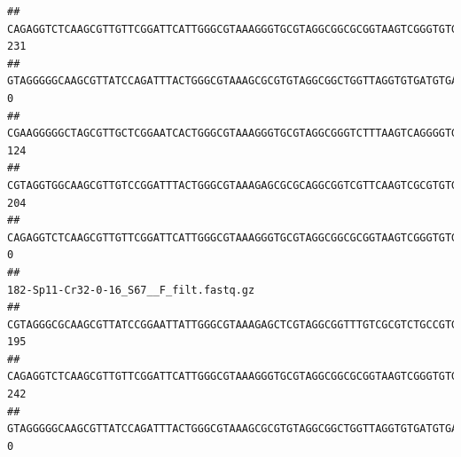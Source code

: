 \documentclass[]{article}
\begin{document}
\begin{verbatim}
## CAGAGGTCTCAAGCGTTGTTCGGATTCATTGGGCGTAAAGGGTGCGTAGGCGGCGCGGTAAGTCGGGTGTGAAATCTCGGAGCTTAACTCCGAAACTGCATTCGATACTGCCGTGCTTGAGGACTGGAGAGGAGACTGGAATTTACGGTGTAGCGGTGAAATGCGTAGATATCGTAAGGAAGACCAGTGGCGAAGGCGGGTCTCTGGACAGTTCCTGACGCTGAGGCACGAAGGCCAGGGGAGCAAACG                                     231
## GTAGGGGGCAAGCGTTATCCAGATTTACTGGGCGTAAAGCGCGTGTAGGCGGCTGGTTAGGTGTGATGTGAAATCTTCCGGCTCAACCGGAAAACTGCATTGCAAACCGGCCTGGCTAGAGTGCAGGAGAGGGAAGCGGAATTCCAGGTGTAGCGGTGAAATGCGTAGATATCTGGAGGAACACCAGTGGCGAAGGCGGCTTCCTGGCCTGCAACTGACGCTGAGACGCGAAAGCGTGGGGAGCGAAC                                        0
## CGAAGGGGGCTAGCGTTGCTCGGAATCACTGGGCGTAAAGGGTGCGTAGGCGGGTCTTTAAGTCAGGGGTGAAATCCTGGAGCTCAACTCCAGAACTGCCTTTGATACTGAAGATCTTGAGTTCGGGAGAGGTGAGTGGAACTGCGAGTGTAGAGGTGAAATTCGTAGATATTCGCAAGAACACCAGTGGCGAAGGCGGCTCACTGGCCCGATACTGACGCTGAGGCACGAAAGCGTGGGGAGCAAACA                                     124
## CGTAGGTGGCAAGCGTTGTCCGGATTTACTGGGCGTAAAGAGCGCGCAGGCGGTCGTTCAAGTCGCGTGTGAAAGCCCCCGGCTCAACTGGGGAGGGTCACGCGATACTGATCGACTCGAAGGCAGGAGAGGGTAGTGGAATTCCCGGTGTAGTGGTGAAATGCGTAGATATCGGGAGGAACACCAGTGGCGAAGGCGACTACCTGGCCTGTTCTTGACGCTGAGGCGCGAAAGCTAGGGGAGCAAACG                                     204
## CAGAGGTCTCAAGCGTTGTTCGGATTCATTGGGCGTAAAGGGTGCGTAGGCGGCGCGGTAAGTCGGGTGTGAAATCTCGGGGCTTAACTCCGAAACTGCATTCGATACTGCCGTGCTTGAGGACTGGAGAGGAGACTGGAATTTACGGTGTAGCGGTGAAATGCGTAGATATCGTAAGGAAGACCAGTGGCGAAGGCGGGTCTCTGGACAGTTCCTGACGCTGAGGCACGAAGGCCAGGGGAGCAAACG                                       0
##                                                                                                                                                                                                                                                           182-Sp11-Cr32-0-16_S67__F_filt.fastq.gz
## CGTAGGGCGCAAGCGTTATCCGGAATTATTGGGCGTAAAGAGCTCGTAGGCGGTTTGTCGCGTCTGCCGTGAAAGTCCGGGGCTCAACTCCGGATCTGCGGTGGGTACGGGCAGACTAGAGTGATGTAGGGGAGACTGGAATTCCTGGTGTAGCGGTGAAATGCGCAGATATCAGGAGGAACACCGATGGCGAAGGCAGGTCTCTGGGCATTAACTGACGCTGAGGAGCGAAAGCATGGGGAGCGAACA                                     195
## CAGAGGTCTCAAGCGTTGTTCGGATTCATTGGGCGTAAAGGGTGCGTAGGCGGCGCGGTAAGTCGGGTGTGAAATCTCGGAGCTTAACTCCGAAACTGCATTCGATACTGCCGTGCTTGAGGACTGGAGAGGAGACTGGAATTTACGGTGTAGCGGTGAAATGCGTAGATATCGTAAGGAAGACCAGTGGCGAAGGCGGGTCTCTGGACAGTTCCTGACGCTGAGGCACGAAGGCCAGGGGAGCAAACG                                     242
## GTAGGGGGCAAGCGTTATCCAGATTTACTGGGCGTAAAGCGCGTGTAGGCGGCTGGTTAGGTGTGATGTGAAATCTTCCGGCTCAACCGGAAAACTGCATTGCAAACCGGCCTGGCTAGAGTGCAGGAGAGGGAAGCGGAATTCCAGGTGTAGCGGTGAAATGCGTAGATATCTGGAGGAACACCAGTGGCGAAGGCGGCTTCCTGGCCTGCAACTGACGCTGAGACGCGAAAGCGTGGGGAGCGAAC                                        0

\end{verbatim}
\end{document}

